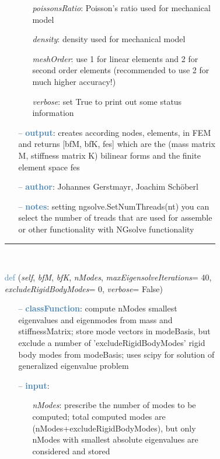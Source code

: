 \begin{itemize}[leftmargin=1.4cm]
\begin{itemize}[leftmargin=1.4cm]
\begin{itemize}[leftmargin=0.5cm]
\begin{itemize}[leftmargin=1.4cm]
\begin{itemize}[leftmargin=1.4cm]
\begin{itemize}[leftmargin=0.5cm]
\begin{itemize}[leftmargin=0.7cm]
\begin{itemize}[leftmargin=1.2cm]
    \item[] {\it     poissonsRatio}: Poisson's ratio used for mechanical model
    \item[] {\it     density}: density used for mechanical model
    \item[] {\it     meshOrder}: use 1 for linear elements and 2 for second order elements (recommended to use 2 for much higher accuracy!)
    \item[] {\it     verbose}: set True to print out some status information
  \end{itemize}
  \item[--]  \textcolor{steelblue}{\bf output}: creates according nodes, elements, in FEM and returns [bfM, bfK, fes] which are the (mass matrix M, stiffness matrix K) bilinear forms and the finite element space fes  \item[--]  \textcolor{steelblue}{\bf author}: Johannes Gerstmayr, Joachim Sch\"oberl  \item[--]  \textcolor{steelblue}{\bf notes}: setting ngsolve.SetNumThreads(nt) you can select the number of treads that are used for assemble or other functionality with NGsolve functionality\vspace{12pt}\end{itemize}
%
\noindent\rule{8cm}{0.75pt}\vspace{1pt} \\ 
\begin{flushleft}
\noindent \textcolor{steelblue}{def {\bf {}}}\label{sec:FEM:FEMinterface:ComputeEigenmodesNGsolve}
({\it self}, {\it bfM}, {\it bfK}, {\it nModes}, {\it maxEigensolveIterations}= 40, {\it excludeRigidBodyModes}= 0, {\it verbose}= False)
\end{flushleft}
\setlength{\itemindent}{0.7cm}
\begin{itemize}[leftmargin=0.7cm]
  \item[--]  \textcolor{steelblue}{\bf classFunction}: compute nModes smallest eigenvalues and eigenmodes from mass and stiffnessMatrix; store mode vectors in modeBasis, but exclude a number of 'excludeRigidBodyModes' rigid body modes from modeBasis; uses scipy for solution of generalized eigenvalue problem  \item[--]  \textcolor{steelblue}{\bf input}: \vspace{-6pt}
  \begin{itemize}[leftmargin=1.2cm]
\setlength{\itemindent}{-0.7cm}
    \item[] {\it nModes}: prescribe the number of modes to be computed; total computed modes are  (nModes+excludeRigidBodyModes), but only nModes with smallest absolute eigenvalues are considered and stored

\end{itemize}
\end{itemize}
\end{itemize}
\end{itemize}
\end{itemize}
\end{itemize}
\end{itemize}
\end{itemize}

